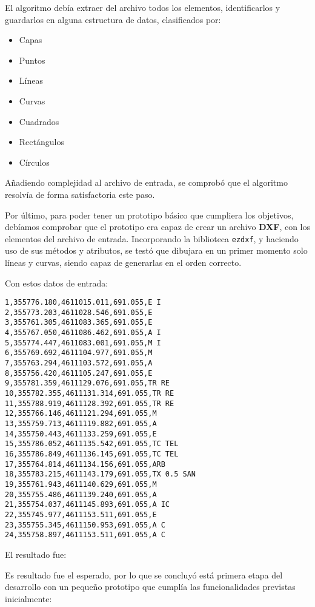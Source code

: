 El algoritmo debía extraer del archivo todos los elementos, identificarlos y guardarlos en alguna estructura de datos, clasificados por:

\begin{itemize}
\item Capas
\item Puntos
\item Líneas
\item Curvas
\item Cuadrados
\item Rectángulos 
\item Círculos
\end{itemize}

Añadiendo complejidad al archivo de entrada, se comprobó que el algoritmo resolvía de forma satisfactoria este paso.

Por último, para poder tener un prototipo básico que cumpliera los objetivos, debíamos comprobar que el prototipo era capaz de crear un archivo \textbf{DXF}, con los elementos del archivo de entrada. Incorporando la biblioteca \texttt{ezdxf}, y haciendo uso de sus métodos y atributos, se testó que dibujara en un primer momento solo líneas y curvas, siendo capaz de generarlas en el orden correcto.

Con estos datos de entrada:

\begin{verbatim}
1,355776.180,4611015.011,691.055,E I
2,355773.203,4611028.546,691.055,E
3,355761.305,4611083.365,691.055,E
4,355767.050,4611086.462,691.055,A I
5,355774.447,4611083.001,691.055,M I
6,355769.692,4611104.977,691.055,M
7,355763.294,4611103.572,691.055,A
8,355756.420,4611105.247,691.055,E
9,355781.359,4611129.076,691.055,TR RE
10,355782.355,4611131.314,691.055,TR RE
11,355788.919,4611128.392,691.055,TR RE
12,355766.146,4611121.294,691.055,M
13,355759.713,4611119.882,691.055,A
14,355750.443,4611133.259,691.055,E
15,355786.052,4611135.542,691.055,TC TEL
16,355786.849,4611136.145,691.055,TC TEL
17,355764.814,4611134.156,691.055,ARB
18,355783.215,4611143.179,691.055,TX 0.5 SAN
19,355761.943,4611140.629,691.055,M
20,355755.486,4611139.240,691.055,A
21,355754.037,4611145.893,691.055,A IC
22,355745.977,4611153.511,691.055,E
23,355755.345,4611150.953,691.055,A C
24,355758.897,4611153.511,691.055,A C
\end{verbatim}

El resultado fue:


Es resultado fue el esperado, por lo que se concluyó está primera etapa del desarrollo con un pequeño prototipo que cumplía las funcionalidades previstas inicialmente:

